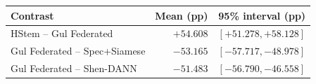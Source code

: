 \begin{tabular}{lrr}
\toprule Contrast & Mean (pp) & 95\% interval (pp)\\
\midrule
HStem -- Gul Federated & $+54.608$ & $[+51.278, +58.128]$\\
Gul Federated -- Spec+Siamese & $-53.165$ & $[-57.717, -48.978]$\\
Gul Federated -- Shen-DANN & $-51.483$ & $[-56.790, -46.558]$\\
\bottomrule
\end{tabular}
